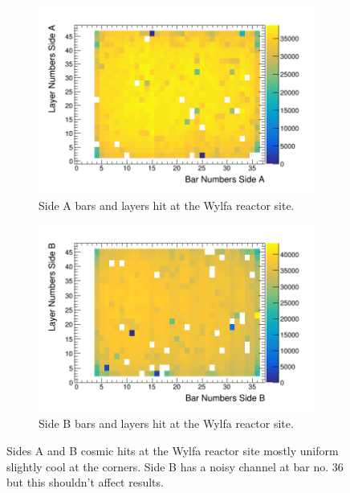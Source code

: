 \documentclass[12pt,a4paper]{article}
\begin{document}
\begin{figure}[H]
\centering
\begin{subfigure}{.5\textwidth}
  \centering
  \includegraphics[width=\linewidth]{sidesAB/sideABarsAndLayersWylfa.png}
  \captionsetup{width=.9\linewidth}
  \caption{Side A bars and layers hit at the Wylfa reactor site.}
  \label{subFig:sideA_Wylfa}
\end{subfigure}%
\begin{subfigure}{.5\textwidth}
  \centering
  \includegraphics[width=\linewidth]{sidesAB/sideBBarsAndLayersWylfa.png}
  \captionsetup{width=.9\linewidth}
  \caption{Side B bars and layers hit at the Wylfa reactor site.}
  \label{subFig:sideB_Wylfa}
\end{subfigure}
\caption{Sides A and B cosmic hits at the Wylfa reactor site mostly uniform slightly cool at the corners. Side B has a noisy channel at bar no. 36 but this shouldn't affect results.}
\label{fig:sideAB_Wylfa}
\end{figure}

% 
%
\printbibliography
\end{document}
